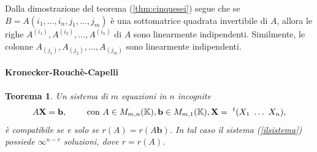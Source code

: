\documentclass{article}
\theoremstyle{plain}
\newtheorem{thm}{Teorema}[section]
\theoremstyle{definition}
\theoremstyle{remark}
\begin{document}
\vspace{10pt}

Dalla dimostrazione del teorema (\ref{thm:cinquesei}) segue che se $B = A(i_1, \ldots, i_n, j_1, \ldots, j_m)$ è
una sottomatrice quadrata invertibile di $A$, allora le righe $A^{(i_1)}, A^{(i_2)}, ..., A^{(i_n)}$ di
$A$ sono linearmente indipendenti. Similmente, le colonne $A_{(j_1)}, A_{(j_2)}, \ldots, A_{(j_m)}$ sono linearmente indipendenti.\\

\vspace{10pt}

\paragraph{Kronecker-Rouchè-Capelli}
\begin{bxthm}
\begin{thm}\label{cinqsett}
    Un sistema di $m$ equazioni in $n$ incognite
    \begin{equation}\label{ilsistema}
        A\mathbf{X}=\mathbf{b},\quad\quad\textup{ con } A\in M_{m,n}(\mathbb{K}), \mathbf{b}\in M_{m,1}(\mathbb{K}), \mathbf{X}=\ ^{t}(X_1 \ \dots \ X_n),
    \end{equation}
    è compatibile se e solo se $r(A)=r(A\mathbf{b})$.
    In tal caso il sistema (\ref{ilsistema}) possiede $\infty^{n-r}$ soluzioni, dove $r=r(A)$.
\end{thm}
\end{bxthm}
\end{document}
